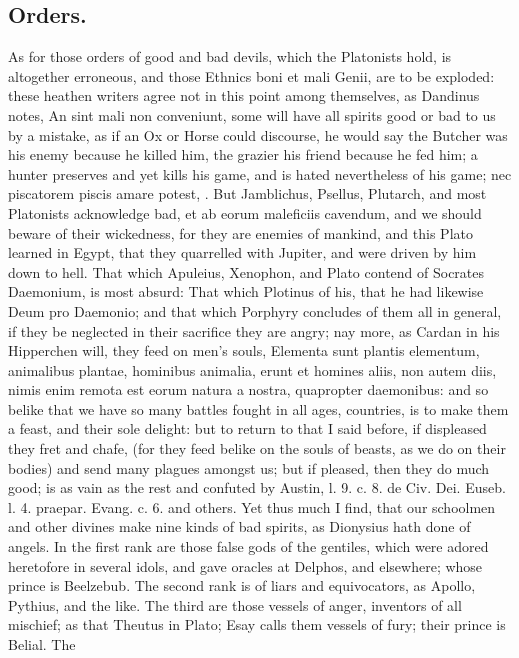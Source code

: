 {\subsection{Orders.}
As for those orders of good and bad devils, which the
Platonists hold, is altogether erroneous, and those Ethnics boni et
mali Genii, are to be exploded: these heathen writers agree not in this
point among themselves, as Dandinus notes, An sint mali non
conveniunt, some will have all spirits good or bad to us by a mistake,
as if an Ox or Horse could discourse, he would say the Butcher was his
enemy because he killed him, the grazier his friend because he fed him;
a hunter preserves and yet kills his game, and is hated nevertheless of
his game; nec piscatorem piscis amare potest, \etc{}. But Jamblichus,
Psellus, Plutarch, and most Platonists acknowledge bad, et ab eorum
maleficiis cavendum, and we should beware of their wickedness, for they
are enemies of mankind, and this Plato learned in Egypt, that they
quarrelled with Jupiter, and were driven by him down to hell.
That which Apuleius, Xenophon, and Plato contend of
Socrates Daemonium, is most absurd: That which Plotinus of his, that he
had likewise Deum pro Daemonio; and that which Porphyry concludes of
them all in general, if they be neglected in their sacrifice they are
angry; nay more, as Cardan in his Hipperchen will, they feed on men's
souls, Elementa sunt plantis elementum, animalibus plantae, hominibus
animalia, erunt et homines aliis, non autem diis, nimis enim remota est
eorum natura a nostra, quapropter daemonibus: and so belike that we
have so many battles fought in all ages, countries, is to make them a
feast, and their sole delight: but to return to that I said before, if
displeased they fret and chafe, (for they feed belike on the souls of
beasts, as we do on their bodies) and send many plagues amongst us; but
if pleased, then they do much good; is as vain as the rest and confuted
by Austin, l. 9. c. 8. de Civ. Dei. Euseb. l. 4. praepar. Evang. c. 6.
and others. Yet thus much I find, that our schoolmen and other
divines make nine kinds of bad spirits, as Dionysius hath done of
angels. In the first rank are those false gods of the gentiles, which
were adored heretofore in several idols, and gave oracles at Delphos,
and elsewhere; whose prince is Beelzebub. The second rank is of liars
and equivocators, as Apollo, Pythius, and the like. The third are those
vessels of anger, inventors of all mischief; as that Theutus in Plato;
Esay calls them vessels of fury; their prince is Belial. The
}
